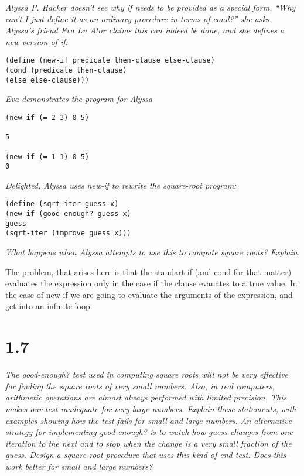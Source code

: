 \documentclass[11pt,oneside,titlepage]{book}
\begin{document}
\textit{Alyssa P. Hacker doesn’t see why if needs to be provided as a special form.
  “Why can’t I just define it as an ordinary procedure in terms of cond?”
  she asks. Alyssa’s friend Eva Lu Ator claims this can indeed be done, and she
  defines a new version of if:}

\begin{verbatim}
(define (new-if predicate then-clause else-clause)
(cond (predicate then-clause)
(else else-clause)))
\end{verbatim}

\textit{Eva demonstrates the program for Alyssa}

\begin{verbatim}
(new-if (= 2 3) 0 5)

5

(new-if (= 1 1) 0 5)
0
\end{verbatim}

\textit{Delighted, Alyssa uses new-if to rewrite the square-root program: }

\begin{verbatim}
(define (sqrt-iter guess x)
(new-if (good-enough? guess x)
guess
(sqrt-iter (improve guess x)))
\end{verbatim}

\textit{What happens when Alyssa attempts to use this to compute square roots? Explain.}

The problem, that arises here is that the standart if (and cond for that matter) evaluates
the expression only in the case if the clause evauates to a true value. In the case of new-if we
are going to evaluate the arguments of the expression, and get into an infinite loop.

\section*{1.7}

\textit{The good-enough? test used in computing
square roots will not be very effective for finding the square
roots of very small numbers. Also, in real computers, arithmetic operations
are almost always performed with limited precision. This makes
our test inadequate for very large
numbers. Explain these statements, with examples showing
how the test fails for small and large numbers. An alternative strategy
for implementing good-enough? is to watch
how guess changes from one iteration to the next and to
stop when the change is a very small fraction of the guess.
Design a square-root procedure that uses this kind of end
test. Does this work better for small and large numbers?}
\end{document}
